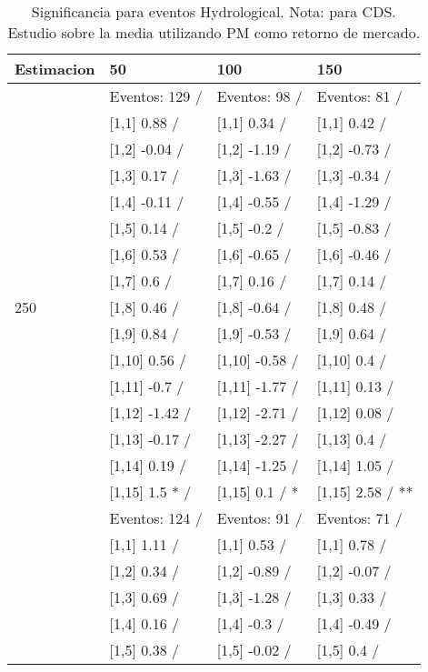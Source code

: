 \begin{table}

\caption{Significancia para eventos Hydrological. Nota: para CDS. Estudio sobre la media utilizando PM como retorno de mercado.}
\centering
\begin{tabular}[t]{llll}
\toprule
Estimacion & 50 & 100 & 150\\
\midrule
 & Eventos:  129 / & Eventos:  98 / & Eventos:  81 /\\
 & {}[1,1] 0.88  / & {}[1,1] 0.34  / & {}[1,1] 0.42  /\\
 & {}[1,2] -0.04  / & {}[1,2] -1.19  / & {}[1,2] -0.73  /\\
 & {}[1,3] 0.17  / & {}[1,3] -1.63  / & {}[1,3] -0.34  /\\
 & {}[1,4] -0.11  / & {}[1,4] -0.55  / & {}[1,4] -1.29  /\\
\addlinespace
 & {}[1,5] 0.14  / & {}[1,5] -0.2  / & {}[1,5] -0.83  /\\
 & {}[1,6] 0.53  / & {}[1,6] -0.65  / & {}[1,6] -0.46  /\\
 & {}[1,7] 0.6  / & {}[1,7] 0.16  / & {}[1,7] 0.14  /\\
250 & {}[1,8] 0.46  / & {}[1,8] -0.64  / & {}[1,8] 0.48  /\\
 & {}[1,9] 0.84  / & {}[1,9] -0.53  / & {}[1,9] 0.64  /\\
\addlinespace
 & {}[1,10] 0.56  / & {}[1,10] -0.58  / & {}[1,10] 0.4  /\\
 & {}[1,11] -0.7  / & {}[1,11] -1.77  / & {}[1,11] 0.13  /\\
 & {}[1,12] -1.42  / & {}[1,12] -2.71  / & {}[1,12] 0.08  /\\
 & {}[1,13] -0.17  / & {}[1,13] -2.27  / & {}[1,13] 0.4  /\\
 & {}[1,14] 0.19  / & {}[1,14] -1.25  / & {}[1,14] 1.05  /\\
\addlinespace
 & {}[1,15] 1.5 * / & {}[1,15] 0.1  / * & {}[1,15] 2.58  / **\\
 & Eventos:  124 / & Eventos:  91 / & Eventos:  71 /\\
 & {}[1,1] 1.11  / & {}[1,1] 0.53  / & {}[1,1] 0.78  /\\
 & {}[1,2] 0.34  / & {}[1,2] -0.89  / & {}[1,2] -0.07  /\\
 & {}[1,3] 0.69  / & {}[1,3] -1.28  / & {}[1,3] 0.33  /\\
\addlinespace
 & {}[1,4] 0.16  / & {}[1,4] -0.3  / & {}[1,4] -0.49  /\\
 & {}[1,5] 0.38  / & {}[1,5] -0.02  / & {}[1,5] 0.4  /\\

\end{tabular}
\end{table}
